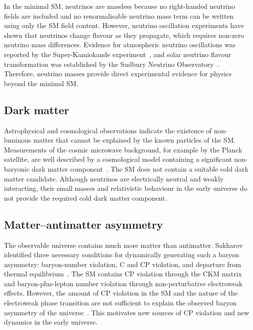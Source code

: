 In the minimal SM, neutrinos are massless because no right-handed neutrino fields are included and no renormalisable neutrino mass term can be written using only the SM field content. 
However, neutrino oscillation experiments have shown that neutrinos change flavour as they propagate, which requires non-zero neutrino mass differences. 
Evidence for atmospheric neutrino oscillations was reported by the Super-Kamiokande experiment~\cite{SuperK1998}, and solar neutrino flavour transformation was established by the Sudbury Neutrino Observatory~\cite{SNO2002}. 
Therefore, neutrino masses provide direct experimental evidence for physics beyond the minimal SM.

\subsection{Dark matter}
\label{subsec:dark_matter}

Astrophysical and cosmological observations indicate the existence of non-luminous matter that cannot be explained by the known particles of the SM. 
Measurements of the cosmic microwave background, for example by the Planck satellite, are well described by a cosmological model containing a significant non-baryonic dark matter component~\cite{Planck2018}. 
The SM does not contain a suitable cold dark matter candidate. 
Although neutrinos are electrically neutral and weakly interacting, their small masses and relativistic behaviour in the early universe do not provide the required cold dark matter component.

\subsection{Matter--antimatter asymmetry}
\label{subsec:baryon_asymmetry}

The observable universe contains much more matter than antimatter. 
Sakharov identified three necessary conditions for dynamically generating such a baryon asymmetry: baryon-number violation, C and CP violation, and departure from thermal equilibrium~\cite{Sakharov1967}. 
The SM contains CP violation through the CKM matrix and baryon-plus-lepton number violation through non-perturbative electroweak effects. 
However, the amount of CP violation in the SM and the nature of the electroweak phase transition are not sufficient to explain the observed baryon asymmetry of the universe~\cite{Gavela1994,Cohen1993}. 
This motivates new sources of CP violation and new dynamics in the early universe.

